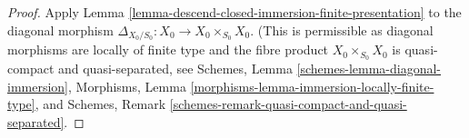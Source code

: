 \documentclass[10pt,a4paper]{amsart}
\theoremstyle{plain}
\theoremstyle{definition}
\theoremstyle{remark}
\numberwithin{equation}{subsection}
\begin{document}
\begin{proof}
Apply Lemma \ref{lemma-descend-closed-immersion-finite-presentation}
to the diagonal morphism $\Delta_{X_0/S_0} : X_0 \to X_0 \times_{S_0} X_0$.
(This is permissible as diagonal morphisms are locally of finite type
and the fibre product $X_0 \times_{S_0} X_0$ is quasi-compact and
quasi-separated, see
Schemes, Lemma \ref{schemes-lemma-diagonal-immersion},
Morphisms, Lemma \ref{morphisms-lemma-immersion-locally-finite-type}, and
Schemes, Remark \ref{schemes-remark-quasi-compact-and-quasi-separated}.
\end{proof}
\end{document}
